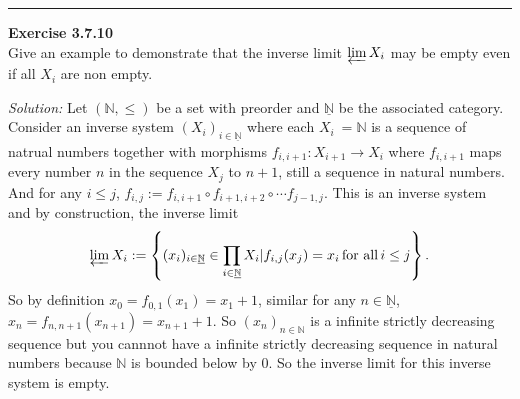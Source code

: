 \documentclass[a4paper, 12pt]{article}
\newenvironment{problem}[2][Exercise]
    { \begin{mdframed}[backgroundcolor=gray!20] \textbf{#1 #2} \\}
    {  \end{mdframed}}
\newenvironment{solution}
    {\textit{Solution:}}
    {}
\begin{document}
\noindent\rule{7in}{2.8pt}
\begin{problem}{3.7.10}
Give an example to demonstrate that the inverse limit \(\varprojlim X_i\) may be empty even if all \(X_i\) are non empty.	
\end{problem}
\begin{solution}
Let \((\mathbb{N},\leq)\) be a set with preorder and \(\underline{\mathbb{N}}\) be the associated category. Consider an inverse system \((X_i)_{i\in \underline{\mathbb{N}}}\) where each \(X_i\:=\mathbb{N}\) is 
a sequence of natrual numbers together with morphisms \(f_{i,i+1}:X_{i+1}\rightarrow X_i\) where \(f_{i,i+1}\) maps every number \(n\) in the sequence \(X_j\) to \(n+1\), still a sequence in natural numbers. And for any \(i\leq j\), 
\(f_{i,j}:=f_{i,i+1}\circ f_{i+1,i+2}\circ \cdots f_{j-1,j}\). This is an inverse system and by construction, the inverse limit 
\[\varprojlim X_i:=\left\{ (x_i)_{i\in \underline{\mathbb{N}}}\in \prod_{i\in \underline{\mathbb{N}}}X_i|f_{i,j}(x_j)=x_i \, \text{for all}\, i\leq j\right\}.\]
So by definition \(x_0=f_{0,1}(x_1)=x_1+1\), similar for any \(n\in \underline{\mathbb{N}}\), \(x_n=f_{n,n+1}(x_{n+1})=x_{n+1}+1\). So \((x_n)_{n\in \mathbb{N}}\) is a infinite strictly decreasing sequence but you cannnot have a infinite strictly decreasing sequence 
in natural numbers because \(\mathbb{N}\) is bounded below by \(0\). So the inverse limit for this inverse system is empty. 
\end{solution}
\end{document}
